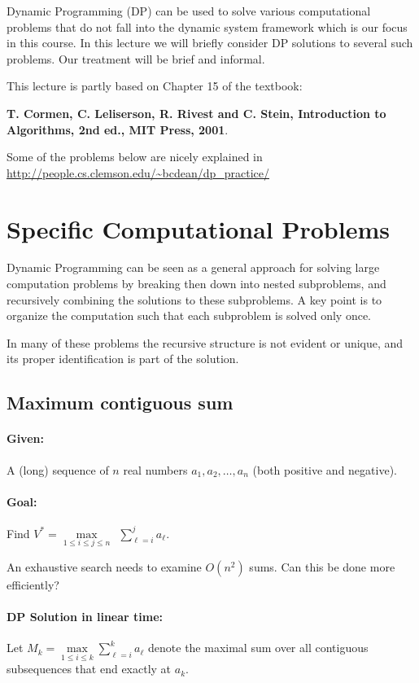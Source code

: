 Dynamic Programming (DP) can be used to solve various computational problems that do not fall into the dynamic system framework which is our focus in this course. In this lecture we will briefly consider DP solutions to several such problems. Our treatment will be brief and informal.

This lecture is partly based on Chapter 15 of the textbook:

\textbf{T. Cormen, C. Leliserson, R. Rivest and C. Stein, Introduction to Algorithms, 2nd ed., MIT Press, 2001}.

Some of the problems below are nicely explained in
\url{http://people.cs.clemson.edu/~bcdean/dp_practice/}

\section{Specific Computational Problems }

Dynamic Programming can be seen as a general approach for solving large computation problems by breaking then down into nested subproblems, and recursively combining the solutions to these subproblems. A key point is to organize the computation such that each subproblem is solved only once.

In many of these problems the recursive structure is not evident or unique, and its proper identification is part of the solution.

\subsection{Maximum contiguous sum}
\paragraph{Given: }  A (long) sequence of $n$ real numbers ${a_1},{a_2}, \ldots ,{a_n}$ (both positive and negative).
\paragraph{Goal:}   Find  ${V^*} = \mathop {\max }\limits_{1 \le i \le j \le n} \;\,\sum\limits_{\ell  = i}^j {{a_\ell }} .$

An exhaustive search needs to examine $O({n^2})$ sums. Can this be done more efficiently?

\paragraph{DP Solution in linear time:}
Let   ${M_k} = \mathop {\max }\limits_{1 \le i \le k} \sum\limits_{\ell  = i}^k {{a_\ell }} $  denote the maximal sum over all contiguous subsequences that end exactly at ${a_k}$.

